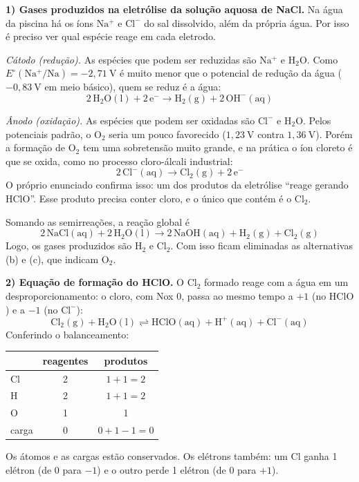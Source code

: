 \documentclass{article}%
\begin{document}
\textbf{1) Gases produzidos na eletrólise da solução aquosa de NaCl.}
Na água da piscina há os íons $\mathrm{Na^+}$ e $\mathrm{Cl^-}$ do sal dissolvido, além da própria água. Por isso é preciso ver qual espécie reage em cada eletrodo.

\emph{Cátodo (redução).} As espécies que podem ser reduzidas são $\mathrm{Na^+}$ e $\mathrm{H_2O}$. Como $E^\circ(\mathrm{Na^+/Na}) = -2{,}71\ \mathrm{V}$ é muito menor que o potencial de redução da água ($-0{,}83\ \mathrm{V}$ em meio básico), quem se reduz é a água:
\[
\mathrm{2\,H_2O(l) + 2\,e^- \longrightarrow H_2(g) + 2\,OH^-(aq)}
\]

\emph{Ânodo (oxidação).} As espécies que podem ser oxidadas são $\mathrm{Cl^-}$ e $\mathrm{H_2O}$. Pelos potenciais padrão, o $\mathrm{O_2}$ seria um pouco favorecido ($1{,}23\ \mathrm{V}$ contra $1{,}36\ \mathrm{V}$). Porém a formação de $\mathrm{O_2}$ tem uma sobretensão muito grande, e na prática o íon cloreto é que se oxida, como no processo cloro-álcali industrial:
\[
\mathrm{2\,Cl^-(aq) \longrightarrow Cl_2(g) + 2\,e^-}
\]
O próprio enunciado confirma isso: um dos produtos da eletrólise ``reage gerando $\mathrm{HClO}$''. Esse produto precisa conter cloro, e o único que contém é o $\mathrm{Cl_2}$.

Somando as semirreações, a reação global é
\[
\mathrm{2\,NaCl(aq) + 2\,H_2O(l) \longrightarrow 2\,NaOH(aq) + H_2(g) + Cl_2(g)}
\]
Logo, os gases produzidos são $\mathrm{H_2}$ e $\mathrm{Cl_2}$. Com isso ficam eliminadas as alternativas (b) e (c), que indicam $\mathrm{O_2}$.

\textbf{2) Equação de formação do HClO.}
O $\mathrm{Cl_2}$ formado reage com a água em um desproporcionamento: o cloro, com Nox $0$, passa ao mesmo tempo a $+1$ (no $\mathrm{HClO}$) e a $-1$ (no $\mathrm{Cl^-}$):
\[
\mathrm{Cl_2(g) + H_2O(l) \rightleftharpoons HClO(aq) + H^+(aq) + Cl^-(aq)}
\]
Conferindo o balanceamento:
\begin{center}
\begin{tabular}{l|c|c}
 & reagentes & produtos \\ \hline
Cl & 2 & $1 + 1 = 2$ \\
H & 2 & $1 + 1 = 2$ \\
O & 1 & 1 \\
carga & 0 & $0 + 1 - 1 = 0$ \\
\end{tabular}
\end{center}
Os átomos e as cargas estão conservados. Os elétrons também: um Cl ganha 1 elétron (de $0$ para $-1$) e o outro perde 1 elétron (de $0$ para $+1$).
\end{document}
